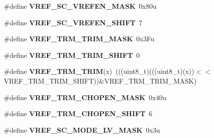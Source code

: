 \begin{DoxyCompactItemize}
\item 
\#define {\bfseries V\+R\+E\+F\+\_\+\+S\+C\+\_\+\+V\+R\+E\+F\+E\+N\+\_\+\+M\+A\+SK}~0x80u\hypertarget{group__VREF__Register__Masks_ga2df8186aa60a77e25e67589bc50ce539}{}\label{group__VREF__Register__Masks_ga2df8186aa60a77e25e67589bc50ce539}

\item 
\#define {\bfseries V\+R\+E\+F\+\_\+\+S\+C\+\_\+\+V\+R\+E\+F\+E\+N\+\_\+\+S\+H\+I\+FT}~7\hypertarget{group__VREF__Register__Masks_gaca5e397ea8b43f55854f4a6b80ec479b}{}\label{group__VREF__Register__Masks_gaca5e397ea8b43f55854f4a6b80ec479b}

\item 
\#define {\bfseries V\+R\+E\+F\+\_\+\+T\+R\+M\+\_\+\+T\+R\+I\+M\+\_\+\+M\+A\+SK}~0x3\+Fu\hypertarget{group__VREF__Register__Masks_gaf233ddf56401003ec721b808d3910978}{}\label{group__VREF__Register__Masks_gaf233ddf56401003ec721b808d3910978}

\item 
\#define {\bfseries V\+R\+E\+F\+\_\+\+T\+R\+M\+\_\+\+T\+R\+I\+M\+\_\+\+S\+H\+I\+FT}~0\hypertarget{group__VREF__Register__Masks_ga7738b4edb18c8c9dcb36d6be564c80e6}{}\label{group__VREF__Register__Masks_ga7738b4edb18c8c9dcb36d6be564c80e6}

\item 
\#define {\bfseries V\+R\+E\+F\+\_\+\+T\+R\+M\+\_\+\+T\+R\+IM}(x)~(((uint8\+\_\+t)(((uint8\+\_\+t)(x))$<$$<$V\+R\+E\+F\+\_\+\+T\+R\+M\+\_\+\+T\+R\+I\+M\+\_\+\+S\+H\+I\+FT))\&V\+R\+E\+F\+\_\+\+T\+R\+M\+\_\+\+T\+R\+I\+M\+\_\+\+M\+A\+SK)\hypertarget{group__VREF__Register__Masks_ga7b200f282af693ea614c6bb380a5bfb8}{}\label{group__VREF__Register__Masks_ga7b200f282af693ea614c6bb380a5bfb8}

\item 
\#define {\bfseries V\+R\+E\+F\+\_\+\+T\+R\+M\+\_\+\+C\+H\+O\+P\+E\+N\+\_\+\+M\+A\+SK}~0x40u\hypertarget{group__VREF__Register__Masks_gaca90564d0247d6637d487fa045dbe328}{}\label{group__VREF__Register__Masks_gaca90564d0247d6637d487fa045dbe328}

\item 
\#define {\bfseries V\+R\+E\+F\+\_\+\+T\+R\+M\+\_\+\+C\+H\+O\+P\+E\+N\+\_\+\+S\+H\+I\+FT}~6\hypertarget{group__VREF__Register__Masks_gad66c35e7a2372a16a0ef1042ad0d029a}{}\label{group__VREF__Register__Masks_gad66c35e7a2372a16a0ef1042ad0d029a}

\item 
\#define {\bfseries V\+R\+E\+F\+\_\+\+S\+C\+\_\+\+M\+O\+D\+E\+\_\+\+L\+V\+\_\+\+M\+A\+SK}~0x3u\hypertarget{group__VREF__Register__Masks_ga7eb8ab4b25ed9f93b23d7199c50e7181}{}\label{group__VREF__Register__Masks_ga7eb8ab4b25ed9f93b23d7199c50e7181}


\end{DoxyCompactItemize}
